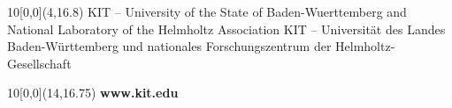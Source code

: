 \begin{titlepage}
\begin{textblock}{10}[0,0](4,16.8)
\tiny{ 
		{KIT -- University of the State of Baden-Wuerttemberg and National Laboratory of the Helmholtz Association}
		{KIT -- Universit\"at des Landes Baden-W\"urttemberg und nationales Forschungszentrum der Helmholtz-Gesellschaft}
}
\end{textblock}

\begin{textblock}{10}[0,0](14,16.75)
\large{
	\textbf{www.kit.edu} 
}
\end{textblock}

\end{titlepage}
